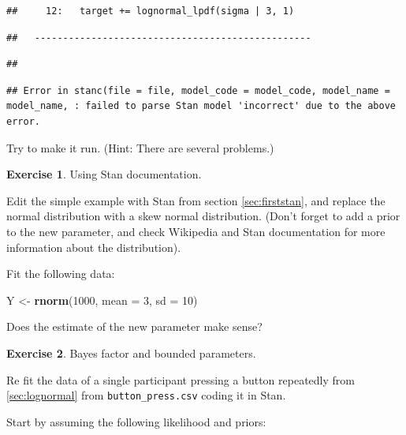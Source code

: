 \documentclass[12pt,]{krantz}
\newenvironment{Shaded}{\begin{snugshade}}{\end{snugshade}}
\newcommand{\KeywordTok}[1]{\textcolor[rgb]{0.13,0.29,0.53}{\textbf{#1}}}
\newcommand{\DataTypeTok}[1]{\textcolor[rgb]{0.13,0.29,0.53}{#1}}
\newcommand{\DecValTok}[1]{\textcolor[rgb]{0.00,0.00,0.81}{#1}}
\newcommand{\StringTok}[1]{\textcolor[rgb]{0.31,0.60,0.02}{#1}}
\newcommand{\NormalTok}[1]{#1}
\theoremstyle{definition}
\theoremstyle{definition}
\theoremstyle{definition}
\newtheorem{exercise}{Exercise}[chapter]
\theoremstyle{remark}
\begin{document}
\begin{verbatim}
##     12:   target += lognormal_lpdf(sigma | 3, 1)
\end{verbatim}

\begin{verbatim}
##   -------------------------------------------------
\end{verbatim}

\begin{verbatim}
## 
\end{verbatim}

\begin{verbatim}
## Error in stanc(file = file, model_code = model_code, model_name = model_name, : failed to parse Stan model 'incorrect' due to the above error.
\end{verbatim}

Try to make it run. (Hint: There are several problems.)

\begin{exercise}
\protect\hypertarget{exr:skewstan}{}{\label{exr:skewstan} }Using Stan
documentation. \end{exercise}

Edit the simple example with Stan from section \ref{sec:firststan}, and
replace the normal distribution with a skew normal distribution. (Don't
forget to add a prior to the new parameter, and check Wikipedia and Stan
documentation for more information about the distribution).

Fit the following data:

\begin{Shaded}
\begin{Highlighting}[]
\NormalTok{Y <-}\StringTok{ }\KeywordTok{rnorm}\NormalTok{(}\DecValTok{1000}\NormalTok{, }\DataTypeTok{mean =} \DecValTok{3}\NormalTok{, }\DataTypeTok{sd =} \DecValTok{10}\NormalTok{)}
\end{Highlighting}
\end{Shaded}

Does the estimate of the new parameter make sense?

\begin{exercise}
\protect\hypertarget{exr:lognstan}{}{\label{exr:lognstan} }Bayes factor and
bounded parameters. \end{exercise}

Re fit the data of a single participant pressing a button repeatedly
from \ref{sec:lognormal} from \texttt{button\_press.csv} coding it in
Stan.

Start by assuming the following likelihood and priors:
\end{document}

